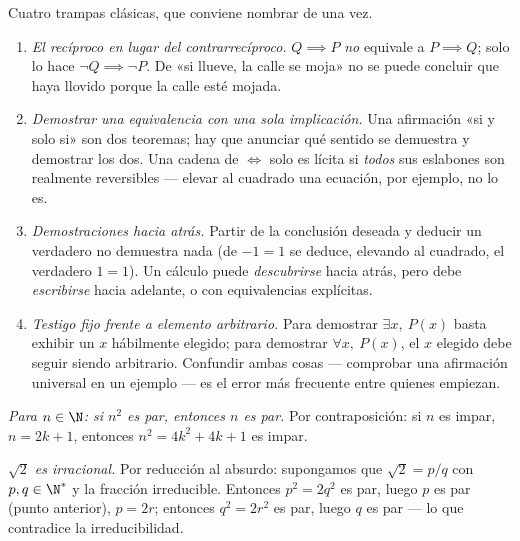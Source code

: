 \begin{remark}\label{rem:b1:logic:pitfalls}
Cuatro trampas clásicas, que conviene nombrar de una vez.
\begin{enumerate}
  \item \emph{El recíproco en lugar del contrarrecíproco.}
        $Q \implies P$ \emph{no} equivale a $P \implies Q$; solo lo hace
        $\lnot Q \implies \lnot P$. De «si llueve, la calle se moja» no
        se puede concluir que haya llovido porque la calle esté mojada.
  \item \emph{Demostrar una equivalencia con una sola implicación.} Una
        afirmación «si y solo si» son dos teoremas; hay que anunciar qué
        sentido se demuestra y demostrar los dos. Una cadena de $\iff$
        solo es lícita si \emph{todos} sus eslabones son realmente
        reversibles --- elevar al cuadrado una ecuación, por ejemplo, no
        lo es.
  \item \emph{Demostraciones hacia atrás.} Partir de la conclusión
        deseada y deducir un  verdadero no demuestra nada (de
        $-1 = 1$ se deduce, elevando al cuadrado, el verdadero
        $1 = 1$). Un cálculo puede \emph{descubrirse} hacia atrás, pero
        debe \emph{escribirse} hacia adelante, o con equivalencias
        explícitas.
  \item \emph{Testigo fijo frente a elemento arbitrario.} Para demostrar
        $\exists x,\ P(x)$ basta exhibir un $x$ hábilmente elegido; para
        demostrar $\forall x,\ P(x)$, el $x$ elegido debe seguir siendo
        arbitrario. Confundir ambas cosas --- comprobar una afirmación
        universal en un ejemplo --- es el error más frecuente entre
        quienes empiezan.
\end{enumerate}
\end{remark}

\begin{example}\label{ex:b1:logic:sqrt2}
\emph{Para $n \in \N$: si $n^2$ es par, entonces $n$ es par.} Por
contraposición: si $n$ es impar, $n = 2k+1$, entonces
$n^2 = 4k^2 + 4k + 1$ es impar.

\emph{$\sqrt 2$ es irracional.} Por reducción al absurdo: supongamos que
$\sqrt 2 = p/q$ con $p, q \in \N^*$ y la fracción irreducible. Entonces
$p^2 = 2q^2$ es par, luego $p$ es par (punto anterior), $p = 2r$;
entonces $q^2 = 2r^2$ es par, luego $q$ es par --- lo que contradice la
irreducibilidad.
\end{example}

